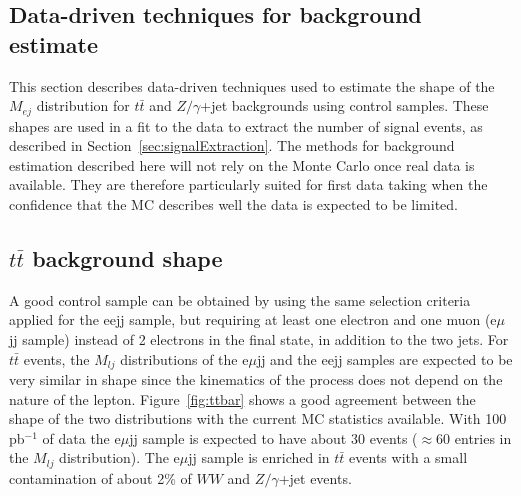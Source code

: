 \documentclass{cmspaper}
\begin{document}
\begin{linenumbers}
\section{Data-driven techniques for background estimate} \label{sec:bkgStudy}
This section describes data-driven techniques used to estimate the shape of the $M_{ej}$ distribution for $t\bar{t}$ and $Z/\gamma$+jet backgrounds using 
control samples. These shapes are used in a fit to the data to extract the number of signal events, as described 
in Section~\ref{sec:signalExtraction}. The methods for background estimation described here will not rely on the Monte Carlo 
once real data is available. They are
therefore particularly suited for first data taking when the confidence that the MC describes well the data is expected to be limited.
\subsection{$t\bar{t}$ background shape}
A good control sample can be obtained by using the same selection criteria applied for the eejj sample, but 
requiring at least one electron and one muon (e$\mu$jj sample) instead of 2 electrons in the final state, in addition to the two jets. 
For $t\bar{t}$ events, the $M_{lj}$ distributions of the e$\mu$jj and the eejj samples
are expected to be very similar in shape since the kinematics of the process does not depend 
on the nature of the lepton. 
 Figure~\ref{fig:ttbar} shows a good agreement between 
the shape of the two distributions with the current MC statistics available. 
With 100 pb$^{-1}$ of data the e$\mu$jj sample is expected to have about 30 events ($\approx 60$ entries in the 
$M_{lj}$ distribution). 
The e$\mu$jj sample is enriched in $t\bar{t}$ events with a small contamination of about 
2\% of $WW$ and $Z/\gamma$+jet events. 



\end{linenumbers}
\end{document}
